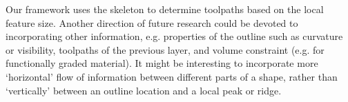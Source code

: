 Our framework uses the skeleton to determine toolpaths based on the local feature size.
Another direction of future research could be devoted to incorporating other information, e.g. properties of the outline such as curvature or visibility, toolpaths of the previous layer, and volume constraint (e.g. for functionally graded material).
It might be interesting to incorporate more `horizontal' flow of information between different parts of a shape, rather than `vertically' between an outline location and a local peak or ridge. 

